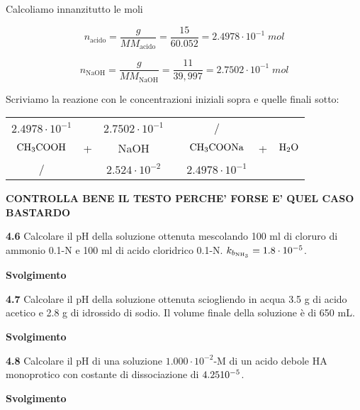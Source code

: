 \vspace{0.2cm}Calcoliamo innanzitutto le moli

$$n_{\text{acido}}=\frac{g}{MM_{\text{acido}}}=\frac{15}{60.052}=2.4978 \cdot 10^{-1}\;mol$$

$$n_{\text{NaOH}}=\frac{g}{MM_{\text{NaOH}}}=\frac{11}{39,997}=2.7502 \cdot 10^{-1}\;mol$$

Scriviamo la reazione con le concentrazioni iniziali sopra e quelle finali sotto:

\begin{center}
    \begin{tabular}{ccccccc}
        $2.4978 \cdot 10^{-1}$ &  & $2.7502 \cdot 10^{-1}$ & & / &&\\
        $\rm CH_3COOH$ & + & NaOH & \ce{->} & $\rm CH_3COONa$ & + & $\rm H_2O$\\
        / &  &  $2.524 \cdot 10^{-2}$ & & $2.4978 \cdot 10^{-1}$&&\\
    \end{tabular}
\end{center}

\textbf{CONTROLLA BENE IL TESTO PERCHE' FORSE E' QUEL CASO BASTARDO}

\vspace{0.2cm}\textbf{4.6} Calcolare il pH della soluzione ottenuta mescolando 100 ml di cloruro di ammonio 0.1-N e 100
ml di acido cloridrico 0.1-N. $k_{b_{\rm NH_3}}=1.8 \cdot 10^{-5}$.

\vspace{0.2cm}\large\textbf{Svolgimento}\normalsize

\vspace{0.2cm}

\vspace{0.2cm}\textbf{4.7} Calcolare il pH della soluzione ottenuta sciogliendo in acqua 3.5 g di acido acetico e 2.8 g di idrossido di sodio. Il volume finale della soluzione è di 650 mL.

\vspace{0.2cm}\large\textbf{Svolgimento}\normalsize

\vspace{0.2cm}

\vspace{0.2cm}\textbf{4.8} Calcolare il pH di una soluzione $1.000 \cdot 10^{-2}$-M di un acido debole HA monoprotico con costante di dissociazione di $4.25 \rm  10^{-5}$.

\vspace{0.2cm}\large\textbf{Svolgimento}\normalsize

